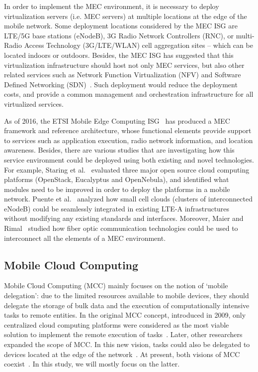 \documentclass[twocolumn,preprint,3p]{elsarticle}
\begin{document}
In order to implement the MEC environment, it is necessary to deploy virtualization servers (i.e. MEC servers) at multiple locations at the edge of the mobile network. Some deployment locations considered by the MEC ISG are LTE/5G base stations (eNodeB), 3G Radio Network Controllers (RNC), or multi-Radio Access Technology (3G/LTE/WLAN) cell aggregation sites -- which can be located indoors or outdoors. Besides, the MEC ISG has suggested that this virtualization infrastructure should host not only MEC services, but also other related services such as Network Function Virtualization (NFV) and Software Defined Networking (SDN)~\cite{MEDwhite15}. Such deployment would reduce the deployment costs, and provide a common management and orchestration infrastructure for all virtualized services.

As of 2016, the ETSI Mobile Edge Computing ISG~\cite{MEDwhite14} has produced a MEC framework and reference architecture, whose functional elements provide support to services such as application execution, radio network information, and location awareness. Besides, there are various studies that are investigating how this service environment could be deployed using both existing and novel technologies. For example, Staring et al.~\cite{Staring13} evaluated three major open source cloud computing platforms (OpenStack, Eucalyptus and OpenNebula), and identified what modules need to be improved in order to deploy the platforms in a mobile network. Puente et al.~\cite{Puente15} analyzed how small cell clouds (clusters of interconnected eNodeB) could be seamlessly integrated in existing LTE-A infrastructures without modifying any existing standards and interfaces. Moreover, Maier and Rimal~\cite{Martin15} studied how fiber optic communication technologies could be used to interconnect all the elements of a MEC environment.



\subsection{Mobile Cloud Computing}
\label{overview:mcc}

Mobile Cloud Computing (MCC) mainly focuses on the notion of `mobile delegation': due to the limited resources available to mobile devices, they should delegate the storage of bulk data and the execution of computationally intensive tasks to remote entities. In the original MCC concept, introduced in 2009, only centralized cloud computing platforms were considered as the most viable solution to implement the remote execution of tasks~\cite{Ali09}. Later, other researchers expanded the scope of MCC. In this new vision, tasks could also be delegated to devices located at the edge of the network~\cite{Bahl12}. At present, both visions of MCC coexist~\cite{Rahimi14}. In this study, we will mostly focus on the latter.
\end{document}
